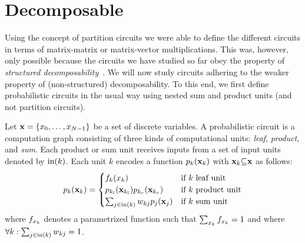 
\section{Decomposable \puncs}
\label{sec:nsdnmcircuit}

Using the concept of partition circuits we were able to define the different circuits in terms of matrix-matrix or matrix-vector multiplications. This was, however, only possible because the circuits we have studied so far obey the property of \textit{structured decomposability}~\citep{pipatsrisawat2008new,darwiche2011sdd}.
We will now study circuits adhering to the weaker property of (non-structured) decomposability. To this end, we first define probabilistic circuits in the usual way using nested sum and product units \citep{vergari2021compositional} (and not partition circuits).

\begin{definition}
	\label{def:probabilisticcircuit}
	Let   $\mathbf{x} = \{x_0, \allowbreak \dots ,\allowbreak x_{N{-}1}  \}$ be a set of discrete variables.
	A probabilistic circuit is a computation graph consisting of three kinds of computational units:
	\textit{leaf}, \textit{product}, and \textit{sum}.
	Each product or sum unit receives inputs from a set of input units denoted by $\text{in}(k)$.
	Each unit $k$ encodes a function $p_{k}(\mathbf{x}_k)$ with $\mathbf{x}_k {\subseteq} \mathbf{x}$ as follows:
	\begin{align*}
		{\ensuremath{p}}_k(\mathbf{x}_k)=
		\begin{cases}
			f_k({x_k})                                                & \text{if $k$ leaf unit}    \\
			p_{k_l}(\mathbf{x}_{k_l})  p_{k_r} (\mathbf{x}_{k_r}) & \text{if $k$ product unit} \\
			\sum_{j\in\text{in}(k)} w_{kj} p_j(\mathbf{x}_j)      & \text{if $k$ sum unit}
		\end{cases}
	\end{align*}
	where $f_{x_k}$  denotes a parametrized function such that $\sum_{x_k} f_{x_k}=1$ and where $\forall k: \sum_{j\in\text{in}(k)} w_{kj} =1$.
\end{definition}

